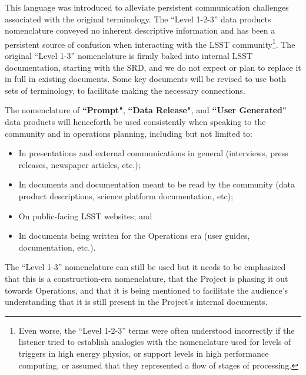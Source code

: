 \documentclass[12pt]{article}
\begin{document}
This language was introduced to alleviate persistent communication challenges associated with the original terminology.  
The ``Level 1-2-3'' data products nomenclature conveyed no inherent descriptive information and has been a persistent source of confusion when interacting with the LSST community\footnote{Even worse, the ``Level 1-2-3'' terms were often understood incorrectly if the listener tried to establish analogies with the nomenclature used for levels of triggers in high energy physics, or support levels in high performance computing, or assumed that they represented a flow of stages of processing.}.
The original ``Level 1-3'' nomenclature is firmly baked into internal LSST documentation, starting with the SRD, and we do not expect or plan to replace it in full in existing documents. 
Some key documents will be revised to use both sets of terminology, to facilitate making the necessary connections.

The nomenclature of {\bf ``Prompt"}, {\bf ``Data Release"}, and {\bf ``User Generated"} data products will henceforth be used consistently when speaking to the community and in operations planning, including but not limited to: 
\begin{itemize}
\item In presentations and external communications in general (interviews, press
          releases, newspaper articles, etc.);
\item In documents and documentation meant to be read by the community (data 
          product descriptions, science platform documentation, etc);
\item On public-facing LSST websites; and
\item In documents being written for the Operations era (user guides, documentation, etc.).
\end{itemize}

The ``Level 1-3'' nomenclature can still be used but it needs to be emphasized that this is a construction-era nomenclature, that the Project is phasing it out towards Operations, and that it is being mentioned to facilitate the audience's understanding that it is still present in the Project's internal documents. 
\end{document}
